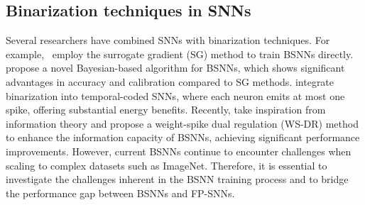 \subsection{Binarization techniques in SNNs}


Several researchers have combined SNNs with binarization techniques.
For example,~\cite{qiao2021direct} employ the surrogate gradient (SG) method to train BSNNs directly. 
\cite{jang2021bisnn} propose a novel Bayesian-based algorithm for BSNNs, which shows significant advantages in accuracy and calibration compared to SG methods. 
\cite{kheradpisheh2022bs4nn} integrate binarization into temporal-coded SNNs, where each neuron emits at most one spike, offering substantial energy benefits. 
Recently, \cite{wei2024q} take inspiration from information theory and propose a weight-spike dual regulation (WS-DR) method to enhance the information capacity of BSNNs, achieving significant performance improvements. 
However, current BSNNs continue to encounter challenges when scaling to complex datasets such as ImageNet.
Therefore, it is essential to investigate the challenges inherent in the BSNN training process and to bridge the performance gap between BSNNs and FP-SNNs.